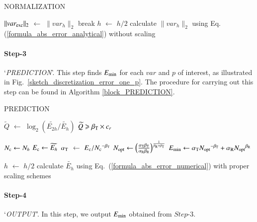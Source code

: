 \documentclass[review,3p]{elsarticle}
\begin{document}
\vspace{0.2cm}
\begin{algorithm}[H]
\caption{NORMALIZATION}
\label{algo_scaling_factor}
{
    {
        $\|var_{\rm exc}\|_{2}$ $\gets$ $\|var_{h}\|_{2}$\;
        break\;
    }
    {
        $h$ $\gets$ $h/2$\;
        calculate $\|var_h\|_{2}$ using Eq. (\ref{formula_abs_error_analytical}) without scaling\;    
    }
}
\end{algorithm}
                                                                   
\paragraph{Step-3} `\textit{PREDICTION}'. This step finds $E_{\rm min}$ for each $var$ and $p$ of interest, as illustrated in Fig.~\ref{sketch_discretization_error_one_p}.
The procedure for carrying out this step can be found in Algorithm \ref{block_PREDICTION}.

\vspace{0.2cm}
\begin{algorithm}[H]
\caption{PREDICTION}			%
\label{block_PREDICTION}
    {
        $\widetilde{Q}$ $\gets$ $\log _2 \left( {\widetilde {E_{2h}}}/{\widetilde {E_{h}}} \right)$\;
        \eIf
        {
            $\widetilde{Q} \geqslant \beta_{\rm T} \times c_r$
        }
        {
            $N_{\rm c} \gets N_h$\;
            $E_{\rm c} \gets \widetilde {E_{h}}$\;
            $\alpha_{\rm T}$ $\gets$ ${E_{\rm c}}/{N_{\rm c}}^{- \beta_{\rm T}}$\;
            $N_{\rm opt} \gets \left( \frac{\alpha_{\rm T} \beta_{\rm T}}{\alpha _{\rm R} \beta_{\rm R}} \right)^{\frac{1}{\beta_{\rm R} + \beta_{\rm T}}}$\;
            $E_{\rm min} \gets \alpha_{\rm T} {N_{\rm opt}}^{- {\beta _{\rm T}}} + \alpha_{\rm R} {N_{\rm opt}}^{{\beta _{\rm R}}}$\;

        }
        {
            $h$ $\gets$ $h/2$\;
            calculate $\widetilde {E_{h}}$ using Eq.~(\ref{formula_abs_error_numerical}) with proper scaling schemes\;
        }
	}    
\end{algorithm}

\paragraph{Step-4} `\textit{OUTPUT}'. In this step, we output $E_{\rm min}$ obtained from $Step$-3.
\end{document}

